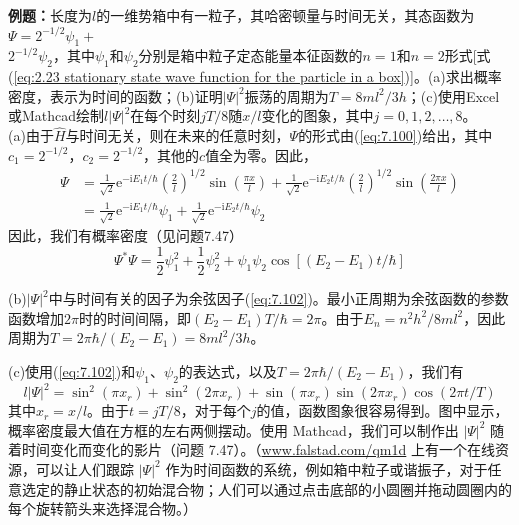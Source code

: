     \begin{examplebox}
        \textbf{例题：}长度为$l$的一维势箱中有一粒子，其哈密顿量与时间无关，其态函数为$\Psi = 2^{-1/2}\psi_1+ $\\$ 2^{-1/2}\psi_2$，其中$\psi_1$和$\psi_2$分别是箱中粒子定态能量本征函数的$n=1$和$n=2$形式[式(\ref{eq:2.23 stationary state wave function for the particle in a box})]。(a)求出概率密度，表示为时间的函数；(b)证明$\left|\Psi\right|^2$振荡的周期为$T = 8ml^2/3h$；(c)使用Excel或Mathcad绘制$l\left|\Psi\right|^2$在每个时刻$jT/8$随$x/l$变化的图象，其中$j=0,1,2,\ldots,8$。
        \\

        (a)由于$\hat{H}$与时间无关，则在未来的任意时刻，$\Psi$的形式由(\ref{eq:7.100})给出，其中$c_1=2^{-1/2}$，$c_2=2^{-1/2}$，其他的$c$值全为零。因此，
        \begin{equation*}
            \begin{aligned}
                \Psi &= \frac{1}{\sqrt{2}}\mathrm{e}^{-\mathrm{i}E_1t/\hbar}\left(\frac{2}{l}\right)^{1/2}\sin\left(\frac{\pi x}{l}\right) + \frac{1}{\sqrt{2}}\mathrm{e}^{-\mathrm{i}E_2t/\hbar}\left(\frac{2}{l}\right)^{1/2}\sin\left(\frac{2\pi x}{l}\right) \\
                & = \frac{1}{\sqrt{2}}\mathrm{e}^{-\mathrm{i}E_1t/\hbar}\psi_1 + \frac{1}{\sqrt{2}}\mathrm{e}^{-\mathrm{i}E_2t/\hbar}\psi_2
            \end{aligned}
        \end{equation*}
        因此，我们有概率密度（见问题7.47）
        \begin{equation}
            \Psi^{\ast}\Psi = \frac{1}{2}\psi_1^2+\frac{1}{2}\psi_2^2 + \psi_1\psi_2\cos\left[\left(E_2-E_1\right)t/\hbar\right]
            \label{eq:7.102}
        \end{equation}

        (b)$\left|\Psi\right|^2$中与时间有关的因子为余弦因子(\ref{eq:7.102})。最小正周期为余弦函数的参数函数增加$2\pi$时的时间间隔，即$\left(E_2-E_1\right)T/\hbar = 2\pi$。由于$E_n = n^2h^2/8ml^2$，因此周期为$T = 2\pi\hbar/\left(E_2-E_1\right) = 8ml^2/3h$。

        (c)使用(\ref{eq:7.102})和$\psi_1$、$\psi_2$的表达式，以及$T = 2\pi\hbar/\left(E_2-E_1\right)$，我们有
        \begin{equation}
            l\left|\Psi\right|^2 = \sin^2\left(\pi x_r\right) + \sin^2\left(2\pi x_r\right) + \sin\left(\pi x_r\right)\sin\left(2\pi x_r\right)\cos\left(2\pi t/T\right)
            \label{eq:7.103}
        \end{equation}
        其中$x_r = x/l$。由于$t = jT/8$，对于每个$j$的值，函数图象很容易得到。图中显示，概率密度最大值在方框的左右两侧摆动。使用 Mathcad，我们可以制作出 $\left|\Psi\right|^2$ 随着时间变化而变化的影片（问题 7.47）。（\url{www.falstad.com/qm1d} 上有一个在线资源，可以让人们跟踪 $\left|\Psi\right|^2$ 作为时间函数的系统，例如箱中粒子或谐振子，对于任意选定的静止状态的初始混合物；人们可以通过点击底部的小圆圈并拖动圆圈内的每个旋转箭头来选择混合物。）
    \end{examplebox}

